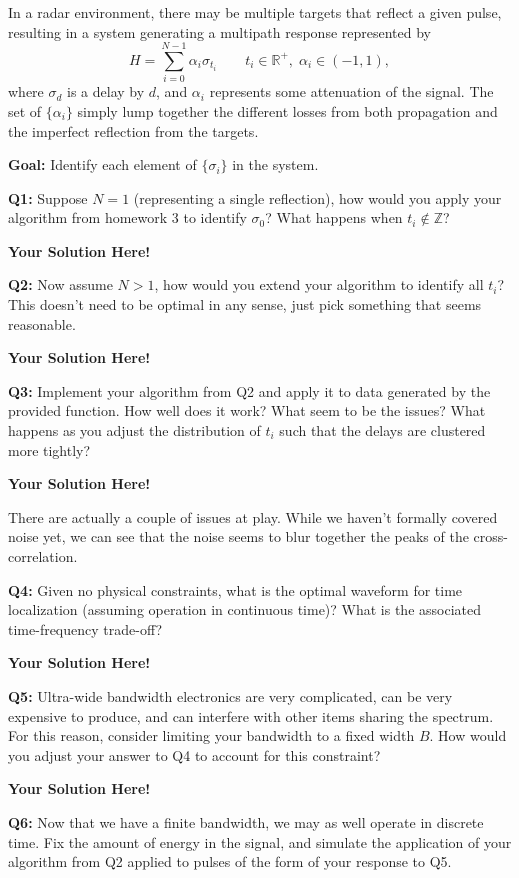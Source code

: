 \documentclass[12pt]{article}
\newcommand{\0}{\mathbf{0}}
\newcommand{\1}{\mathbf{1}}
\newcommand{\solspace}{\vspace{3mm} \textbf{Your Solution Here!} \vspace{3mm}}
\begin{document}
In a radar environment, there may be multiple targets that reflect a given pulse, resulting in a system generating a multipath response represented by
\begin{equation}
    H = \sum_{i=0}^{N-1} \alpha_i\sigma_{t_i} \qquad t_i \in \mathbb{R}^+, \;\alpha_i \in (-1,1),
\end{equation}
where $\sigma_d$ is a delay by $d$, and $\alpha_i$ represents some attenuation of the signal.
The set of $\{\alpha_i\}$ simply lump together the different losses from both propagation and the imperfect reflection from the targets.

\textbf{Goal: } Identify each element of $\{\sigma_i\}$ in the system.

\textbf{Q1: } Suppose $N=1$ (representing a single reflection), how would you apply your algorithm from homework 3 to identify $\sigma_0$?
What happens when $t_i \notin \mathbb{Z}$?

\solspace

\textbf{Q2: } Now assume $N>1$, how would you extend your algorithm to identify all $t_i$?
This doesn't need to be optimal in any sense, just pick something that seems reasonable.

\solspace

\textbf{Q3: } Implement your algorithm from Q2 and apply it to data generated by the provided function.
How well does it work? What seem to be the issues?
What happens as you adjust the distribution of $t_i$ such that the delays are clustered more tightly?

\solspace

There are actually a couple of issues at play.
While we haven't formally covered noise yet, we can see that the noise seems to blur together the peaks of the cross-correlation.

\textbf{Q4: } Given no physical constraints, what is the optimal waveform for time localization (assuming operation in continuous time)? What is the associated time-frequency trade-off?

\solspace

\textbf{Q5: } Ultra-wide bandwidth electronics are very complicated, can be very expensive to produce, and can interfere with other items sharing the spectrum. For this reason, consider limiting your bandwidth to a fixed width $B$. How would you adjust your answer to Q4 to account for this constraint?

\solspace

\textbf{Q6: } Now that we have a finite bandwidth, we may as well operate in discrete time. Fix the amount of energy in the signal, and simulate the application of your algorithm from Q2 applied to pulses of the form of your response to Q5.
\end{document}
